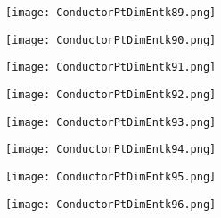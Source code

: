 \documentclass[pdf]{beamer}
\begin{document}
\begin{frame}
\begin{figure}[!h]
\centering
\texttt{[image: ConductorPtDimEntk89.png]}
\end{figure}
\end{frame}

\begin{frame}
\begin{figure}[!h]
\centering
\texttt{[image: ConductorPtDimEntk90.png]}
\end{figure}
\end{frame}

\begin{frame}
\begin{figure}[!h]
\centering
\texttt{[image: ConductorPtDimEntk91.png]}
\end{figure}
\end{frame}

\begin{frame}
\begin{figure}[!h]
\centering
\texttt{[image: ConductorPtDimEntk92.png]}
\end{figure}
\end{frame}

\begin{frame}
\begin{figure}[!h]
\centering
\texttt{[image: ConductorPtDimEntk93.png]}
\end{figure}
\end{frame}

\begin{frame}
\begin{figure}[!h]
\centering
\texttt{[image: ConductorPtDimEntk94.png]}
\end{figure}
\end{frame}

\begin{frame}
\begin{figure}[!h]
\centering
\texttt{[image: ConductorPtDimEntk95.png]}
\end{figure}
\end{frame}

\begin{frame}
\begin{figure}[!h]
\centering
\texttt{[image: ConductorPtDimEntk96.png]}
\end{figure}
\end{frame}
\end{document}
